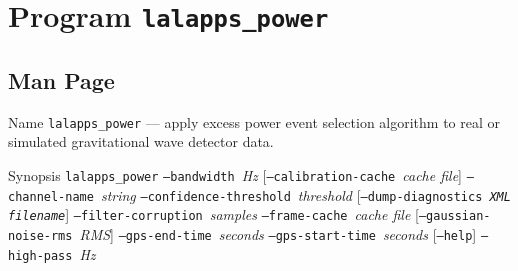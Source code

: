 \documentclass[10pt]{article}
\newcommand{\prog}[1]{\texttt{#1}}
\newcommand{\option}[1]{\texttt{#1}}
\newcommand{\parm}[1]{\textit{#1}}
\newenvironment{entry}%
{\begin{list}{}{\renewcommand{\makelabel}[1]%
{\parbox[b]{\labelwidth}{\makebox[0pt][l]{\textbf{##1}}\\}}%
\setlength{\labelwidth}{1em}%
\setlength{\labelsep}{1em}%
\setlength{\leftmargin}{2em}%
\setlength{\topsep}{\medskipamount}%
\setlength{\itemsep}{\medskipamount}%
\setlength{\parsep}{\medskipamount}%
\setlength{\listparindent}{0pt}}}
{\end{list}}
\begin{document}
\section{Program \prog{lalapps\_power}}


\subsection{Man Page}


\begin{entry}

\item[Name]
\prog{lalapps\_power} --- apply excess power event selection algorithm to
real or simulated gravitational wave detector data.

\item[Synopsis]
\prog{lalapps\_power} \newline \hspace*{0.5in}
\option{--bandwidth}~\parm{Hz} \newline \hspace*{0.5in}
[\option{--calibration-cache}~\parm{cache file}] \newline \hspace*{0.5in}
\option{--channel-name}~\parm{string} \newline \hspace*{0.5in}
\option{--confidence-threshold}~\parm{threshold} \newline \hspace*{0.5in}
[\option{--dump-diagnostics~\parm{XML filename}}] \newline \hspace*{0.5in}
\option{--filter-corruption}~\parm{samples} \newline \hspace*{0.5in}
\option{--frame-cache}~\parm{cache file} \newline \hspace*{0.5in}
[\option{--gaussian-noise-rms}~\parm{RMS}] \newline \hspace*{0.5in}
\option{--gps-end-time}~\parm{seconds} \newline \hspace*{0.5in}
\option{--gps-start-time}~\parm{seconds} \newline \hspace*{0.5in}
[\option{--help}] \newline \hspace*{0.5in}
\option{--high-pass}~\parm{Hz} \newline \hspace*{0.5in}

\end{entry}
\end{document}
